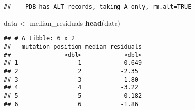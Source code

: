 \documentclass[
]{article}
\newenvironment{Shaded}{\begin{snugshade}}{\end{snugshade}}
\newcommand{\FunctionTok}[1]{\textcolor[rgb]{0.13,0.29,0.53}{\textbf{#1}}}
\newcommand{\NormalTok}[1]{#1}
\newcommand{\OtherTok}[1]{\textcolor[rgb]{0.56,0.35,0.01}{#1}}
\begin{document}
\begin{verbatim}
##    PDB has ALT records, taking A only, rm.alt=TRUE
\end{verbatim}

\begin{Shaded}
\begin{Highlighting}[]
\NormalTok{data }\OtherTok{\textless{}{-}}\NormalTok{ median\_residuals}
\FunctionTok{head}\NormalTok{(data)}
\end{Highlighting}
\end{Shaded}

\begin{verbatim}
## # A tibble: 6 x 2
##   mutation_position median_residuals
##               <dbl>            <dbl>
## 1                 1            0.649
## 2                 2           -2.35 
## 3                 3           -1.80 
## 4                 4           -3.22 
## 5                 5           -0.182
## 6                 6           -1.86
\end{verbatim}
\end{document}
